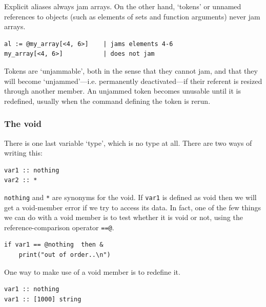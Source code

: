 \documentclass{article}
\newenvironment{code}{
       \begin{list}{}{
               \setlength{\leftmargin}{.4in}
               \setlength{\rightmargin}{0in}
               \setlength{\topsep}{.2in}
       }
       \small
       \item[] }
       { \end{list}   }
\begin{document}
Explicit aliases always jam arrays.  On the other hand, `tokens' or unnamed references to objects (such as elements of sets and function arguments) never jam arrays.

\begin{code} \begin{verbatim}
al := @my_array[<4, 6>]    | jams elements 4-6
my_array[<4, 6>]           | does not jam
\end{verbatim} \end{code}

\noindent Tokens are `unjammable', both in the sense that they cannot jam, and that they will become `unjammed'---i.e. permanently deactivated---if their referent is resized through another member.  An unjammed token becomes unusable until it is redefined, usually when the command defining the token is rerun.





\subsubsection{The void}

There is one last variable `type', which is no type at all.  There are two ways of writing this:

\begin{code} \begin{verbatim}
var1 :: nothing
var2 :: *
\end{verbatim} \end{code}

\noindent \verb#nothing# and \verb#*# are synonyms for the void.  If \verb#var1# is defined as void then we will get a void-member error if we try to access its data.  In fact, one of the few things we can do with a void member is to test whether it is void or not, using the reference-comparison operator \verb#==@#.

\begin{code} \begin{verbatim}
if var1 == @nothing  then &
    print("out of order..\n")
\end{verbatim} \end{code}

One way to make use of a void member is to redefine it.

\begin{code} \begin{verbatim}
var1 :: nothing
var1 :: [1000] string
\end{verbatim} \end{code}
\end{document}
